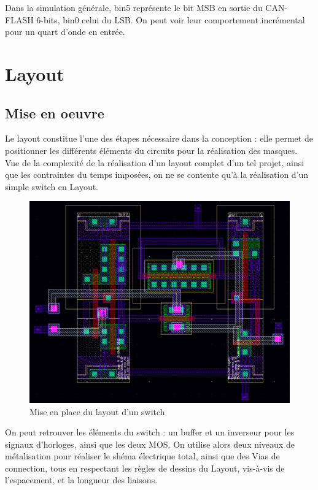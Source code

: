 \documentclass[11pt]{article}
\begin{document}
Dans la simulation g\'en\'erale, bin5 repr\'esente le bit MSB en sortie du CAN-FLASH 6-bits, bin0 celui du LSB. On peut voir leur comportement incr\'emental pour un quart d'onde en entr\'ee. 

\clearpage

\section{Layout}
\subsection{Mise en oeuvre}

Le layout constitue l'une des \'etapes n\'ecessaire dans la conception : elle permet de positionner
les diff\'erents \'el\'ements du circuits pour la r\'ealisation des masques.
Vue de la complexit\'e de la r\'ealisation d'un layout complet d'un tel projet, ainsi que les contraintes
du temps impos\'ees, on ne se contente qu'\`a la r\'ealisation d'un simple switch en Layout.

\begin{figure}[!htb]
      \centering
      \includegraphics[width=\linewidth]{layout_.png}
      \caption{Mise en place du layout d'un switch}
\end{figure}%

On peut retrouver les \'el\'ements du switch : un buffer et un inverseur pour les signaux d'horloges, ainsi que les deux MOS. On utilise alors deux niveaux de m\'etalisation pour r\'ealiser le sh\'ema \'electrique total, ainsi que des Vias de connection, tous en respectant les r\`egles de dessins du Layout, vis-\`a-vis de l'espacement, et la longueur des liaisons.
\end{document}

